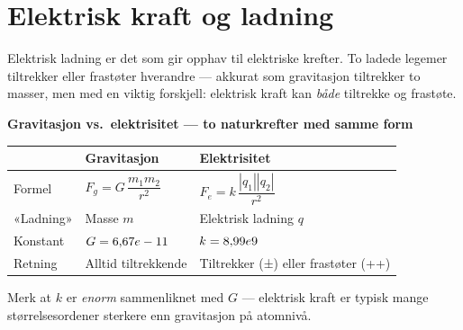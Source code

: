 \section{Elektrisk kraft og ladning}

Elektrisk ladning er det som gir opphav til elektriske krefter.
To ladede legemer tiltrekker eller frastøter hverandre — akkurat som gravitasjon tiltrekker to masser,
men med en viktig forskjell: elektrisk kraft kan \emph{både} tiltrekke og frastøte.


\begin{tcolorbox}[colback=gray!13, colframe=gray!40, boxrule=0.5pt,
    arc=2pt, left=6pt, right=6pt, top=4pt, bottom=4pt]
\textbf{Gravitasjon vs.\ elektrisitet — to naturkrefter med samme form}

\medskip
\begin{tabular}{lll}
  & \textbf{Gravitasjon} & \textbf{Elektrisitet} \\
  \hline
  Formel & $F_g = G\,\dfrac{m_1 m_2}{r^2}$ & $F_e = k\,\dfrac{|q_1||q_2|}{r^2}$ \\[8pt]
  «Ladning» & Masse $m$ & Elektrisk ladning $q$ \\
  Konstant & $G = 6{,}67e-11\,\text{}$ & $k = 8{,}99e9\,\text{}$ \\
  Retning & Alltid tiltrekkende & Tiltrekker (±) eller frastøter (++) \\
\end{tabular}

\medskip
Merk at $k$ er \emph{enorm} sammenliknet med $G$ — elektrisk kraft er typisk mange størrelsesordener sterkere enn gravitasjon på atomnivå.
\end{tcolorbox}


